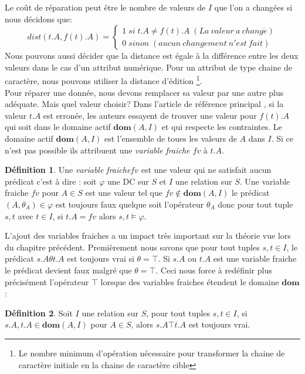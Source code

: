 \documentclass[letterpaper, 12pt]{report}
\theoremstyle{definition}
\newtheorem{mydef}{Définition}
\newcommand{\dom}{\mathbf{dom}}
\begin{document}
Le coût de réparation peut être le nombre de valeurs de $I$ que l'on a changées si nous décidons que:
$$
dist(t.A,f(t).A) =
\left\{
	\begin{array}{ll}
	  1 \; si\; t.A \neq f(t).A \;(La\ valeur\ a\ chang\acute{e}) \\
	  0 \; sinon\;(aucun\ changement\ n'est\ fait)
	\end{array}
\right.
$$
Nous pouvons aussi décider que la distance est égale à la différence entre les deux valeurs dans le cas d'un attribut numérique. Pour un attribut de type chaine de caractère, nous pouvons utiliser la distance d'édition \footnote{Le nombre minimum d'opération nécessaire pour transformer la chaine de caractère initiale en la chaine de caractère cible}.\\

Pour réparer une donnée, nous devons remplacer sa valeur par une autre plus adéquate. Mais quel valeur choisir? Dans l'article de référence principal \cite{main}, si la valeur $t.A$ est erronée, les auteurs essayent de trouver une valeur pour $f(t).A$ qui soit dans le domaine actif $\dom (A,I)$ et qui respecte les contraintes. Le domaine actif $\dom(A,I)$ est l'ensemble de toues les valeurs de $A$ dans $I$. Si ce n'est pas possible ils attribuent une \emph{variable fraiche $fv$} à $t.A$. \\

\begin{mydef}
Une \emph{variable fraiche}$fv$ est une valeur qui ne satisfait aucun prédicat c'est à dire : soit $\varphi$ une DC sur $S$ et $I$ une relation sur $S$. Une variable fraiche $fv$ pour $A \in S$ est une valeur tel que $fv \not\in \dom(A,I)$ le prédicat $(A,\theta_A) \in \varphi$ est toujours faux quelque soit l'opérateur $\theta_A$ donc pour tout tuple $s,t$ avec $t \in I$, si $t.A = fv$ alors ${s,t} \models \varphi$.
\end{mydef}

L'ajout des variables fraiches a un impact très important sur la théorie vue lors du chapitre précédent. Premièrement nous savons que pour tout tuples $s,t \in I$, le prédicat $s.A \theta t.A$ est toujours vrai si $\theta = \top$. Si $s.A$ ou $t.A$ est une variable fraiche le prédicat devient faux malgré que $\theta = \top$. Ceci nous force à redéfinir plus précisément l'opérateur $\top$ lorsque des variables fraiches étendent le domaine $\dom$:

\begin{mydef}
Soit $I$ une relation sur $S$, pour tout tuples $s,t \in I$, si $s.A,t.A \in \dom(A,I)$ pour $A \in S$, alors $s.A \top t.A$ est toujours vrai.
\end{mydef}
\end{document}

